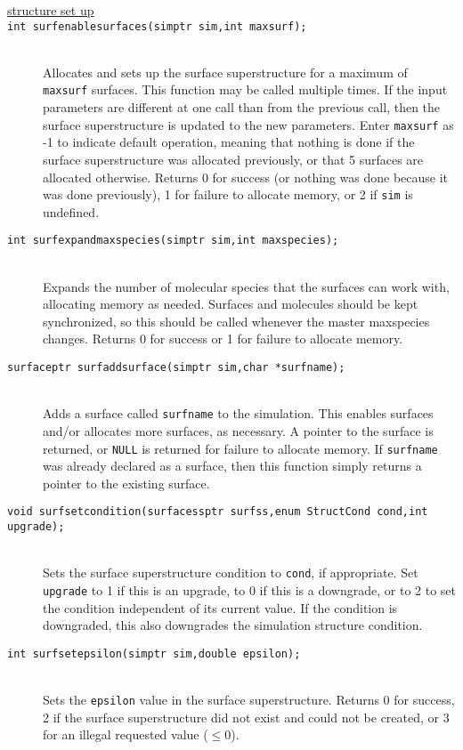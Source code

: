 \documentclass {book}
\begin{document}
\begin{description}
\item[\underline{structure set up}]

\item[\texttt{int surfenablesurfaces(simptr sim,int maxsurf);}]
\hfill \\
Allocates and sets up the surface superstructure for a maximum of \texttt{maxsurf} surfaces.  This function may be called multiple times.  If the input parameters are different at one call than from the previous call, then the surface superstructure is updated to the new parameters.  Enter \texttt{maxsurf} as -1 to indicate default operation, meaning that nothing is done if the surface superstructure was allocated previously, or that 5 surfaces are allocated otherwise.  Returns 0 for success (or nothing was done because it was done previously), 1 for failure to allocate memory, or 2 if \texttt{sim} is undefined.

\item[\texttt{int surfexpandmaxspecies(simptr sim,int maxspecies);}]
\hfill \\
Expands the number of molecular species that the surfaces can work with, allocating memory as needed.  Surfaces and molecules should be kept synchronized, so this should be called whenever the master maxspecies changes.  Returns 0 for success or 1 for failure to allocate memory.

\item[\texttt{surfaceptr surfaddsurface(simptr sim,char *surfname);}]
\hfill \\
Adds a surface called \texttt{surfname} to the simulation.  This enables surfaces and/or allocates more surfaces, as necessary.  A pointer to the surface is returned, or \texttt{NULL} is returned for failure to allocate memory.  If \texttt{surfname} was already declared as a surface, then this function simply returns a pointer to the existing surface.

\item[\texttt{void surfsetcondition(surfacessptr surfss,enum StructCond cond,int upgrade);}]
\hfill \\
Sets the surface superstructure condition to \texttt{cond}, if appropriate.  Set \texttt{upgrade} to 1 if this is an upgrade, to 0 if this is a downgrade, or to 2 to set the condition independent of its current value.  If the condition is downgraded, this also downgrades the simulation structure condition.

\item[\texttt{int surfsetepsilon(simptr sim,double epsilon);}]
\hfill \\
Sets the \texttt{epsilon} value in the surface superstructure.  Returns 0 for success, 2 if the surface superstructure did not exist and could not be created, or 3 for an illegal requested value ($\leq 0$).


\end{description}
\end{document}
